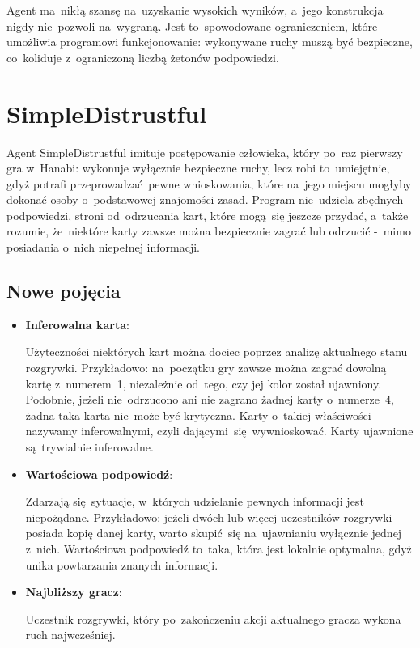 \documentclass[declaration,shortabstract,inz]{iithesis}
\begin{document}
Agent ma~nikłą szansę na~uzyskanie wysokich wyników, a~jego konstrukcja nigdy nie~pozwoli na~wygraną. Jest to~spowodowane ograniczeniem, które umożliwia programowi funkcjonowanie: wykonywane ruchy muszą być bezpieczne, co~koliduje z~ograniczoną liczbą żetonów podpowiedzi.

\section{SimpleDistrustful}

Agent SimpleDistrustful imituje postępowanie człowieka, który po~raz pierwszy gra w~Hanabi: wykonuje wyłącznie bezpieczne ruchy, lecz robi to~umiejętnie, gdyż potrafi przeprowadzać pewne wnioskowania, które na~jego miejscu mogłyby dokonać osoby o~podstawowej znajomości zasad. Program nie~udziela zbędnych podpowiedzi, stroni od~odrzucania kart, które mogą~się jeszcze przydać, a~także rozumie, że~niektóre karty zawsze można bezpiecznie zagrać lub odrzucić -~mimo posiadania o~nich niepełnej informacji.

\subsection*{Nowe pojęcia}

\begin{itemize}
	\item \textbf{Inferowalna karta}:

	Użyteczności niektórych kart można dociec poprzez analizę aktualnego stanu rozgrywki. Przykładowo: na~początku gry zawsze można zagrać dowolną kartę z~numerem~1, niezależnie od~tego, czy jej kolor został ujawniony. Podobnie, jeżeli nie~odrzucono ani nie zagrano żadnej karty o~numerze~4, żadna taka karta nie~może być krytyczna. Karty o~takiej właściwości nazywamy inferowalnymi, czyli dającymi~się wywnioskować. Karty ujawnione są~trywialnie inferowalne.
	
	\item \textbf{Wartościowa podpowiedź}:
	
	Zdarzają się~sytuacje, w~których udzielanie pewnych informacji jest niepożądane. Przykładowo: jeżeli dwóch lub więcej uczestników rozgrywki posiada kopię danej karty, warto skupić~się na~ujawnianiu wyłącznie jednej z~nich. Wartościowa podpowiedź to~taka, która jest lokalnie optymalna, gdyż unika powtarzania znanych informacji.
	
	\item \textbf{Najbliższy gracz}:
	
	Uczestnik rozgrywki, który po~zakończeniu akcji aktualnego gracza wykona ruch najwcześniej.
	
\end{itemize}
\end{document}
